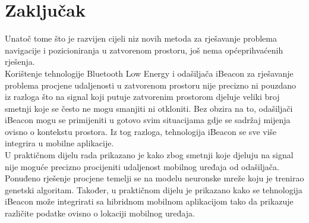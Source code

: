 \chapter{Zaključak}
\label{chap:zakljucak}

Unatoč tome što je razvijen cijeli niz novih metoda za rješavanje problema navigacije i pozicioniranja u zatvorenom prostoru, još nema općeprihvaćenih rješenja. 
\\
Korištenje tehnologije Bluetooth Low Energy i odašiljača iBeacon za rješavanje problema procjene udaljenosti u zatvorenom prostoru nije precizno ni pouzdano iz razloga što na signal koji putuje zatvorenim prostorom djeluje veliki broj smetnji koje se često ne mogu smanjiti ni otkloniti. 
Bez obzira na to, odašiljači iBeacon mogu se primijeniti u gotovo svim situacijama gdje se sadržaj mijenja ovisno o kontekstu prostora. 
Iz tog razloga, tehnologija iBeacon se sve više integrira u mobilne aplikacije.
\\

U praktičnom dijelu rada prikazano je kako zbog smetnji koje djeluju na signal nije moguće precizno procijeniti udaljenost mobilnog uređaja od odašiljača. 
Ponuđeno rješenje procjene temelji se na modelu neuronske mreže koju je trenirao genetski algoritam. 
Također, u praktičnom dijelu je prikazano kako se tehnologija iBeacon može integrirati sa hibridnom mobilnom aplikacijom tako da prikazuje različite podatke ovisno o lokaciji mobilnog uređaja. 
